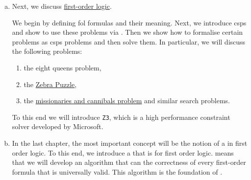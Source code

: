 \begin{enumerate}[(a)]
      As propositional logic is easier to grasp than first-order logic, we start our investigation
      of logic with propositional logic.  Furthermore, propositional logic has the advantage of
      being :  We will present an algorithm that can check whether a propositional formula
      is satisfiable.  In contrast to propositional logic, first-order logic is not decidable.

      Next, we discuss applications of propositional logic:  We will show how the  
      can be reduced to the question whether a formula from propositional logic is satisfiable.  We present
      the algorithm of  that can decide the satisfiability of a propositional formula.
      We will use it to solve various logical puzzles.  In particular, we solve
      \begin{enumerate}
      \item the \href{https://en.wikipedia.org/wiki/Eight_queens_puzzle}{8 queens puzzle}, and
      \item a \href{https://en.wikipedia.org/wiki/Sudoku}{Sudoku puzzle}.
      \end{enumerate}
\item Next, we discuss \href{https://en.wikipedia.org/wiki/First-order_logic}{first-order logic}.

      We begin by defining \gls{fol} formulas and their meaning.  Next, we introduce \glspl{csp}
      and show to use these problems via .  Then we show how to formalise certain problems
      as \glspl{csp} problems and then solve them.  In particular, we will discuss the following problems:
      \begin{enumerate}
      \item the eight queens problem,
      \item the \href{https://en.wikipedia.org/wiki/Zebra_Puzzle}{Zebra Puzzle},
      \item the \href{https://en.wikipedia.org/wiki/Missionaries_and_cannibals_problem}{missionaries and
            cannibals problem} and similar search problems.
      \end{enumerate}
      To this end we will introduce \texttt{Z3}, which is a high performance constraint solver developed by
      Microsoft.
      
      
\item In the last chapter,      
      the most important concept will be the notion of a  in
      first order logic.  To this end, we introduce a  that is
       for first order logic.   means that we will develop an
      algorithm that can  the correctness of every first-order formula that is
      universally valid.  This algorithm is the foundation of .


\end{enumerate}
